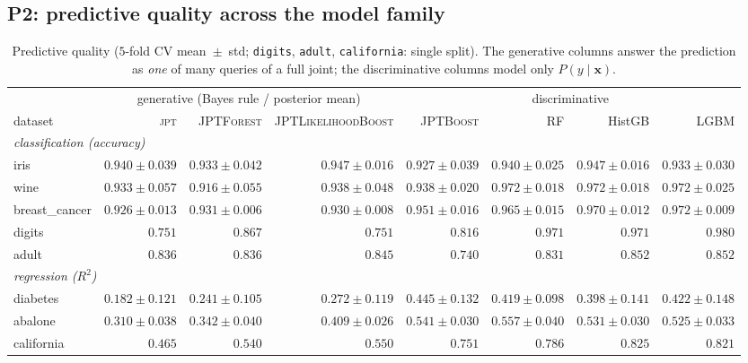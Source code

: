 \documentclass[11pt]{article}
\theoremstyle{plain}
\theoremstyle{definition}
\theoremstyle{remark}
\newcommand{\jpt}{\textsc{jpt}}
\newcommand{\jptforest}{\textsc{JPTForest}}
\newcommand{\likeboost}{\textsc{JPTLikelihoodBoost}}
\newcommand{\jptboost}{\textsc{JPTBoost}}
\begin{document}
\subsection{P2: predictive quality across the model family}
\label{sec:exp-pred}

\begin{table}[t]
\centering
\footnotesize
\setlength{\tabcolsep}{2.5pt}
\begin{tabular}{lrrrrrrr}
\toprule
 & \multicolumn{3}{c}{generative (Bayes rule / posterior mean)} &
   \multicolumn{4}{c}{discriminative}\\
\cmidrule(lr){2-4}\cmidrule(lr){5-8}
dataset & \jpt & \jptforest & \likeboost & \jptboost & RF & HistGB & LGBM\\
\midrule
\multicolumn{8}{l}{\emph{classification (accuracy)}}\\
iris & $0.940 \pm 0.039$ & $0.933 \pm 0.042$ & $0.947 \pm 0.016$ & $0.927 \pm 0.039$ & $0.940 \pm 0.025$ & $0.947 \pm 0.016$ & $0.933 \pm 0.030$ \\
wine & $0.933 \pm 0.057$ & $0.916 \pm 0.055$ & $0.938 \pm 0.048$ & $0.938 \pm 0.020$ & $0.972 \pm 0.018$ & $0.972 \pm 0.018$ & $0.972 \pm 0.025$ \\
breast\_cancer & $0.926 \pm 0.013$ & $0.931 \pm 0.006$ & $0.930 \pm 0.008$ & $0.951 \pm 0.016$ & $0.965 \pm 0.015$ & $0.970 \pm 0.012$ & $0.972 \pm 0.009$ \\
digits & $0.751$ & $0.867$ & $0.751$ & $0.816$ & $0.971$ & $0.971$ & $0.980$ \\
adult & $0.836$ & $0.836$ & $0.845$ & $0.740$ & $0.831$ & $0.852$ & $0.852$ \\
\midrule
\multicolumn{8}{l}{\emph{regression ($R^2$)}}\\
diabetes & $0.182 \pm 0.121$ & $0.241 \pm 0.105$ & $0.272 \pm 0.119$ & $0.445 \pm 0.132$ & $0.419 \pm 0.098$ & $0.398 \pm 0.141$ & $0.422 \pm 0.148$ \\
abalone & $0.310 \pm 0.038$ & $0.342 \pm 0.040$ & $0.409 \pm 0.026$ & $0.541 \pm 0.030$ & $0.557 \pm 0.040$ & $0.531 \pm 0.030$ & $0.525 \pm 0.033$ \\
california & $0.465$ & $0.540$ & $0.550$ & $0.751$ & $0.786$ & $0.825$ & $0.821$ \\
\bottomrule
\end{tabular}
\caption{Predictive quality ($5$-fold CV mean~$\pm$~std;
\texttt{digits}, \texttt{adult}, \texttt{california}: single split).
The generative columns answer the
prediction as \emph{one} of many queries of a full joint; the
discriminative columns model only $P(y\mid\mathbf x)$.}
\label{tab:pred}
\end{table}
\end{document}
